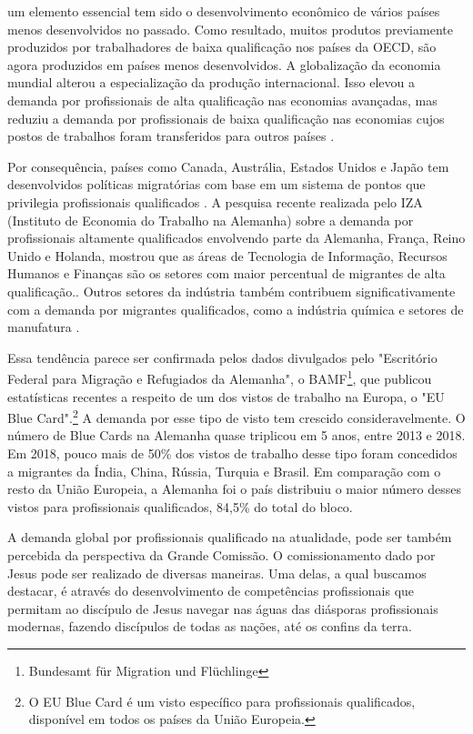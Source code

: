 \documentclass[12pt,openright,oneside,a4paper]{abntex2}
\begin{document}
\begin{citacao} um elemento essencial tem sido o desenvolvimento econômico de vários países menos desenvolvidos no passado. Como resultado, muitos produtos previamente produzidos por trabalhadores de baixa qualificação nos países da OECD, são agora produzidos em países menos desenvolvidos. A globalização da economia mundial alterou a especialização da produção internacional. Isso elevou a demanda por profissionais de alta qualificação nas economias avançadas, mas reduziu a demanda por profissionais de baixa qualificação nas economias cujos postos de trabalhos foram transferidos para outros países \cite[p. 3]{chiswick_high_2005}. \end{citacao}

Por consequência, países como Canada, Austrália, Estados Unidos e Japão tem desenvolvidos políticas migratórias com base em um sistema de pontos que privilegia profissionais qualificados \cite[p. 6]{chiswick_high_2005}. A pesquisa recente realizada pelo IZA (Instituto de Economia do Trabalho na Alemanha) sobre a demanda por profissionais altamente qualificados envolvendo parte da Alemanha, França, Reino Unido e Holanda, mostrou que as áreas de Tecnologia de Informação, Recursos Humanos e Finanças são os setores com maior percentual de migrantes de alta qualificação.\cite[p. 7]{bauer_demand_2004}. Outros setores da indústria também contribuem significativamente com a demanda por migrantes qualificados, como a indústria química e setores de manufatura \cite[p. 18]{bauer_demand_2004}.

Essa tendência parece ser confirmada pelos dados divulgados pelo "Escritório Federal para Migração e Refugiados da Alemanha", o BAMF\footnote{Bundesamt für Migration und Flüchlinge}, que publicou estatísticas recentes a respeito de um dos vistos de trabalho na Europa, o "EU Blue Card".\footnote{O EU Blue Card é um visto específico para profissionais qualificados, disponível em todos os países da União Europeia.} A demanda por esse tipo de visto tem crescido consideravelmente. O número de Blue Cards na Alemanha quase triplicou em 5 anos, entre 2013 e 2018. Em 2018, pouco mais de 50\% dos vistos de trabalho desse tipo foram concedidos a migrantes da Índia, China, Rússia, Turquia e Brasil. Em comparação com o resto da União Europeia, a Alemanha foi o país distribuiu o maior número desses vistos para profissionais qualificados, 84,5\% do total do bloco\cite{bamf}.

A demanda global por profissionais qualificado na atualidade, pode ser também percebida da perspectiva da Grande Comissão. O comissionamento dado por Jesus pode ser realizado de diversas maneiras. Uma delas, a qual buscamos destacar, é através do desenvolvimento de competências profissionais que permitam ao discípulo de Jesus navegar nas águas das diásporas profissionais modernas, fazendo discípulos de todas as nações, até os confins da terra.
\end{document}
